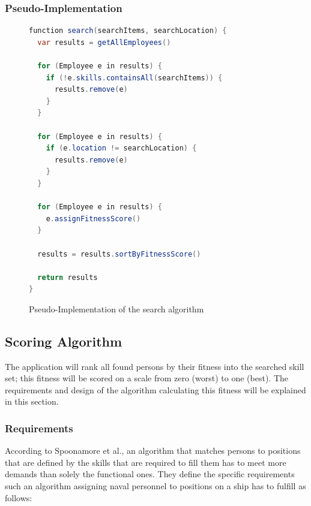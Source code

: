 \newpage

\subsubsection{Pseudo-Implementation}
\begin{figure}[!htp]
\begin{lstlisting}[language=Java]
function search(searchItems, searchLocation) {
  var results = getAllEmployees()

  for (Employee e in results) {
    if (!e.skills.containsAll(searchItems)) {
      results.remove(e)
    }
  }

  for (Employee e in results) {
    if (e.location != searchLocation) {
      results.remove(e)
    }
  }

  for (Employee e in results) {
    e.assignFitnessScore()
  }

  results = results.sortByFitnessScore()

  return results
}
\end{lstlisting}
\caption[Pseudocode: Search Algorithm]{Pseudo-Implementation of the search algorithm}
\end{figure}

\newpage

\subsection{Scoring Algorithm}
\label{fitscorealg}
The application will rank all found persons by their fitness into the searched skill set; this fitness will be scored on a scale from zero (worst) to one (best).
The requirements and design of the algorithm calculating this fitness will be explained in this section.

\subsubsection{Requirements}
According to Spoonamore et al., an algorithm that matches persons to positions that are defined by the skills that are required to fill them has to meet more demands than solely the functional ones. They define the specific requirements such an algorithm assigning naval personnel to positions on a ship has to fulfill as follows:
\cite[P. 14]{USN}

